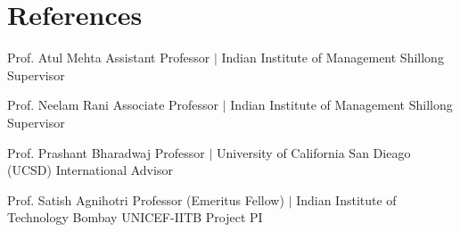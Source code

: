 \section{References}
  \CVSubHeadingListStart
    
    \CVSubheading
      {Prof. Atul Mehta}
      {}
      {Assistant Professor $|$ Indian Institute of Management Shillong}
      {Supervisor}
      \CVItemListStart
      \CVItemListEnd

    \CVSubheading
      {Prof. Neelam Rani}
      {}
      {Associate Professor $|$ Indian Institute of Management Shillong}
      {Supervisor}
      \CVItemListStart
      \CVItemListEnd

    \CVSubheading
      {Prof. Prashant Bharadwaj}
      {}
      {Professor $|$ University of California San Dieago (UCSD)}
      {International Advisor}
      \CVItemListStart
      \CVItemListEnd

    \CVSubheading
      {Prof. Satish Agnihotri}
      {}
      {Professor (Emeritus Fellow) $|$ Indian Institute of Technology Bombay}
      {UNICEF-IITB Project PI}
      \CVItemListStart
      \CVItemListEnd

      
  
    \CVSubHeadingListEnd